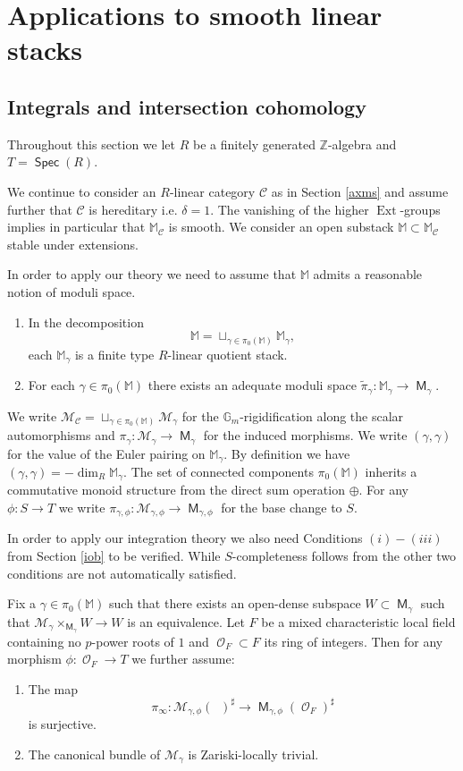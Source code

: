 \documentclass{article}
\DeclareMathOperator{\Oc}{\mathcal{O}}
\newcommand{\Cc}{\mathcal{C}}
\DeclareMathOperator{\M}{{\mathsf{M}}}
\DeclareMathOperator{\Spec}{\mathsf{Spec}}
\DeclareMathOperator{\Oo}{\mathcal{O}}
\newcommand{\BG}{{\mathbb{G}}}
\newcommand{\BM}{{\mathbb{M}}}
\newcommand{\BZ}{{\mathbb{Z}}}
\newcommand{\CM}{{\mathcal M}}
\DeclareMathOperator{\Ext}{Ext}
\DeclareMathOperator{\Dinfty}{\mathbb{D}_F^{1/\infty}}
\theoremstyle{definition}
\theoremstyle{plain}
\begin{document}
\section{Applications to smooth linear stacks}\label{msds}
\subsection{Integrals and intersection cohomology}\label{ii}
Throughout this section we let $R$ be a finitely generated $\BZ$-algebra and $T = \Spec(R)$. 

We continue to consider an $R$-linear category $\Cc$ as in Section \ref{axms} and assume further that $\Cc$ is hereditary i.e. $\delta = 1$. The vanishing of the higher $\Ext$-groups implies in particular that $ \BM_\Cc$ is smooth. We consider an open substack $\BM \subset \BM_\Cc$ stable under extensions. 

In order to apply our theory we need to assume that $\BM$ admits a reasonable notion of moduli space. 


\begin{enumerate}
\item In the decomposition 
\[\BM = \sqcup_{\gamma \in \pi_0(\BM)} \BM_\gamma,\]
each $\BM_\gamma$ is a finite type $R$-linear quotient stack.

\item For each $\gamma \in \pi_0(\BM)$ there exists an adequate moduli space $\tilde{\pi}_\gamma \colon \BM_\gamma \to \M_\gamma$.
\end{enumerate}

We write $\CM_\Cc = \sqcup_{\gamma \in  \pi_0(\BM)} \CM_\gamma$ for the $\BG_m$-rigidification along the scalar automorphisms and $\pi_\gamma\colon \CM_\gamma \to \M_\gamma$ for the induced morphisms. We write $(\gamma,\gamma)$ for the value of the Euler pairing on $\BM_\gamma$. By definition we have  $(\gamma,\gamma) = - \dim_R \BM_\gamma$. The set of connected components $\pi_0(\BM)$ inherits a commutative monoid structure from the direct sum operation $\oplus$.
For any $\phi:S \to T$ we write $\pi_{\gamma,\phi} \colon \CM_{\gamma,\phi} \to \M_{\gamma,\phi}$ for the base change to $S$. 


In order to apply our integration theory we also need Conditions $(i) - (iii)$ from Section \ref{iob} to be verified. While $S$-completeness follows from \cite[Proposition 3.44]{AHH23} the other two conditions are not automatically satisfied.  

Fix a $\gamma \in \pi_0(\BM)$ such that there exists an open-dense subspace $W \subset \M_\gamma$ such that $\CM_\gamma \times_{\M_\gamma} W \to W$ is an equivalence.  Let $F$ be a mixed characteristic local field containing no $p$-power roots of $1$ and $\Oc_F \subset F$ its ring of integers. Then for any morphism $\phi: \Oo_F \to T$ we further assume:
\begin{enumerate}

\item[(iii)] The map 
\[ \pi_{\infty}\colon \CM_{\gamma,\phi}(\Dinfty)^\sharp \to \M_{\gamma,\phi}(\Oc_F)^\sharp\]
is surjective.
\item[(iv)] The canonical bundle of $\CM_{\gamma}$ is Zariski-locally trivial.     
\end{enumerate}
\end{document}
